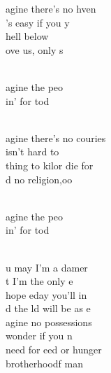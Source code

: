 \documentclass[12pt]{article}
\begin{document}
\begin{multicols*}{2}
\begin{cancion}%
	agine there's no hven\\
	's easy if you y\\
	 hell below \\
	ove us, only s\\\jump\\
	\begin{chorus}%
	agine  the peo\\
	in' for tod\\
	\end{chorus}%
	\jump\\
	agine there's no couries\\
	 isn't hard to \\
	thing to kilor die for\\
	d no religion,oo\\\jump\\
	\begin{chorus}%
	agine  the peo\\
	in' for tod\\
	\end{chorus}%
	\jump\\
	u may  I'm a damer \\
	t I'm  the only e  \\
	hope eday you'll in \\
	d the ld will be as e\\
	agine no possessions\\
	wonder if you n\\
	 need for eed or hunger\\
	brotherhoodf man\\\jump\\
	\begin{chorus}%

\end{chorus}
\end{cancion}
\end{multicols*}
\end{document}
